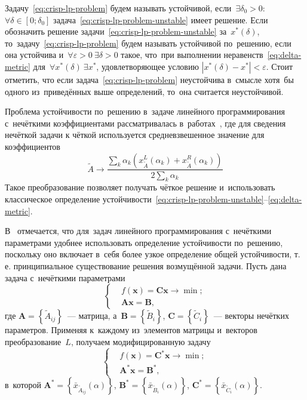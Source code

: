 Задачу~\eqref{eq:crisp-lp-problem} будем называть устойчивой, если~$\exists \delta_0 > 0$: $\forall \delta \in \left[ 0; \delta_0 \right]$  задача~\eqref{eq:crisp-lp-problem-unstable} имеет решение. Если обозначить решение задачи~\eqref{eq:crisp-lp-problem-unstable} за~$x^{*} \left(\delta \right)$, то~задачу~\eqref{eq:crisp-lp-problem} будем называть устойчивой по~решению, если она устойчива и~$\forall \varepsilon>0\ \exists \delta > 0$ такое, что~при выполнении неравенств~\eqref{eq:delta-metric} для~$\forall x^{*} \left(\delta \right)\ \exists x^{*}$, удовлетворяющее условию $\left| x^{*}\left(\delta \right)- x^{*} \right| < \varepsilon$. Стоит отметить, что если задача~\eqref{eq:crisp-lp-problem} неустойчива в~смысле хотя~бы одного из~приведённых выше определений, то~она считается неустойчивой.

Проблема устойчивости по~решению в~задаче линейного программирования с~нечёткими коэффициентами рассматривалась в~работах~\cite{Matveev_Starodubtsev, PhD_Starodubtsev}, где для сведения нечёткой задачи к чёткой используется средневзвешенное значение для коэффициентов
\begin{equation*}
  \tilde A \to \frac{\sum \limits_k \alpha_k \left( x^L_{\tilde A} \left( \alpha_k \right) + x^R_{\tilde A} \left( \alpha_k \right) \right) }{2 \sum \limits_k \alpha_k }
\end{equation*}
Такое преобразование позволяет получать чёткое решение и~использовать классическое определение устойчивости~\eqref{eq:crisp-lp-problem-unstable}--\eqref{eq:delta-metric}.

В~\cite{Vorontsov_VSTU} отмечается, что для~задач линейного программирования с~нечёткими параметрами удобнее использовать определение устойчивости по~решению, поскольку оно включает в~себя более узкое определение общей устойчивости, т.\,е. принципиальное существование решения возмущённой задачи. Пусть дана задача с~нечёткими параметрами
\begin{equation*}
  \left\{ \begin{aligned}
    & f\left( \mathbf{x} \right)=\mathbf{Cx}\to \min;  \\ 
    & \mathbf{Ax}=\mathbf{B},
  \end{aligned} \right.
\end{equation*}
где $\mathbf{A}=\left\{ \tilde{A}_{ij} \right\}$~--- матрица, а~$\mathbf{B}=\left\{ \tilde{B}_i \right\}$, $\mathbf{C}=\left\{\tilde{C}_i \right\}$~--- векторы нечётких параметров. Применяя к~каждому из~элементов матрицы и~векторов преобразование~$L$, получаем модифицированную задачу
\begin{equation}
\label{eq:fuzzy-lp-unstable-problem}
  \left\{ \begin{aligned}
    & f\left( \mathbf{x} \right)={\mathbf{C}^{*}}\mathbf{x}\to \min;  \\ 
    & {\mathbf{A}^{*}}\mathbf{x}={\mathbf{B}}^{*},
  \end{aligned} \right.
\end{equation}
в~которой $\mathbf{A}^{*}=\left\{ \bar{x}_{\tilde{A}_{ij}}\left(\alpha \right) \right\}$, $\mathbf{B}^{*}=\left\{ \bar{x}_{\tilde{B}_i}\left(\alpha \right) \right\}$, $\mathbf{C}^{*}=\left\{ \bar{x}_{\tilde{C}_i}\left(\alpha \right) \right\}$.

